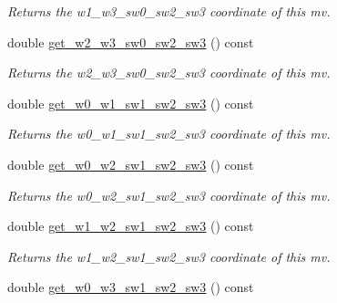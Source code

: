\begin{DoxyCompactItemize}
\begin{DoxyCompactList}\small\item\em Returns the w1\-\_\-w3\-\_\-sw0\-\_\-sw2\-\_\-sw3 coordinate of this mv. \end{DoxyCompactList}\item 
\hypertarget{classe3ga_1_1mv_a903bafebdabcdabedec6daf1965449d3}{double \hyperlink{classe3ga_1_1mv_a903bafebdabcdabedec6daf1965449d3}{get\-\_\-w2\-\_\-w3\-\_\-sw0\-\_\-sw2\-\_\-sw3} () const }\label{classe3ga_1_1mv_a903bafebdabcdabedec6daf1965449d3}

\begin{DoxyCompactList}\small\item\em Returns the w2\-\_\-w3\-\_\-sw0\-\_\-sw2\-\_\-sw3 coordinate of this mv. \end{DoxyCompactList}\item 
\hypertarget{classe3ga_1_1mv_a2684597366f50c554b68964bf7a375a3}{double \hyperlink{classe3ga_1_1mv_a2684597366f50c554b68964bf7a375a3}{get\-\_\-w0\-\_\-w1\-\_\-sw1\-\_\-sw2\-\_\-sw3} () const }\label{classe3ga_1_1mv_a2684597366f50c554b68964bf7a375a3}

\begin{DoxyCompactList}\small\item\em Returns the w0\-\_\-w1\-\_\-sw1\-\_\-sw2\-\_\-sw3 coordinate of this mv. \end{DoxyCompactList}\item 
\hypertarget{classe3ga_1_1mv_ac72181294d1670b3fe8cab119326041e}{double \hyperlink{classe3ga_1_1mv_ac72181294d1670b3fe8cab119326041e}{get\-\_\-w0\-\_\-w2\-\_\-sw1\-\_\-sw2\-\_\-sw3} () const }\label{classe3ga_1_1mv_ac72181294d1670b3fe8cab119326041e}

\begin{DoxyCompactList}\small\item\em Returns the w0\-\_\-w2\-\_\-sw1\-\_\-sw2\-\_\-sw3 coordinate of this mv. \end{DoxyCompactList}\item 
\hypertarget{classe3ga_1_1mv_a93e23724bdea14a93294f49f7f1db069}{double \hyperlink{classe3ga_1_1mv_a93e23724bdea14a93294f49f7f1db069}{get\-\_\-w1\-\_\-w2\-\_\-sw1\-\_\-sw2\-\_\-sw3} () const }\label{classe3ga_1_1mv_a93e23724bdea14a93294f49f7f1db069}

\begin{DoxyCompactList}\small\item\em Returns the w1\-\_\-w2\-\_\-sw1\-\_\-sw2\-\_\-sw3 coordinate of this mv. \end{DoxyCompactList}\item 
\hypertarget{classe3ga_1_1mv_a1e9ebd2a28a4302997fb13f362f738ae}{double \hyperlink{classe3ga_1_1mv_a1e9ebd2a28a4302997fb13f362f738ae}{get\-\_\-w0\-\_\-w3\-\_\-sw1\-\_\-sw2\-\_\-sw3} () const }\label{classe3ga_1_1mv_a1e9ebd2a28a4302997fb13f362f738ae}


\end{DoxyCompactItemize}
